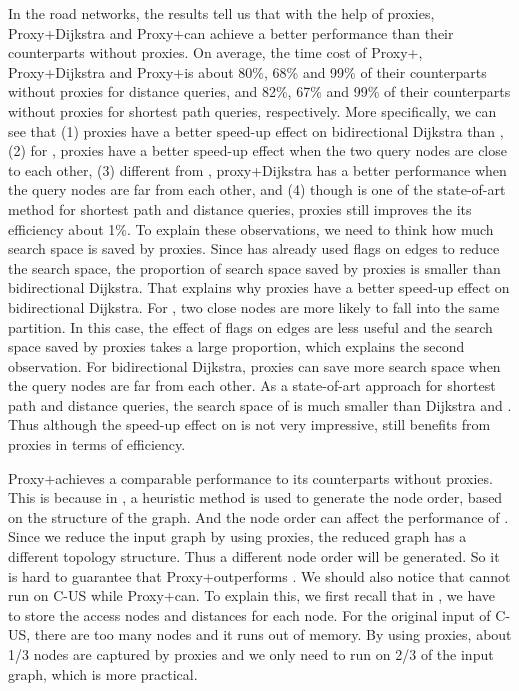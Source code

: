 In the road networks, the results tell us that with the help of proxies, Proxy+Dijkstra and Proxy+\arcflag can achieve a better performance than their counterparts without proxies. On average, the time cost of Proxy+\arcflag, Proxy+Dijkstra and Proxy+\ah is about 80\%, 68\% and 99\% of their counterparts without proxies for distance queries, and 82\%, 67\% and 99\% of their counterparts without proxies for shortest path queries, respectively. More specifically, we can see that (1) proxies have a better speed-up effect on bidirectional Dijkstra than \arcflag, (2) for \arcflag, proxies have a better speed-up effect when the two query nodes are close to each other, (3) different from \arcflag, proxy+Dijkstra has a better performance when the query nodes are far from each other, and (4) though \ah is one of the state-of-art method for shortest path and distance queries, proxies still improves the its efficiency about 1\%. To explain these observations, we need to think how much search space is saved by proxies. Since \arcflag has already used flags on edges to reduce the search space, the proportion of search space saved by proxies is smaller than bidirectional Dijkstra. That explains why proxies have a better speed-up effect on bidirectional Dijkstra. For \arcflag, two close nodes are more likely to fall into the same partition. In this case, the effect of flags on edges are less useful and the search space saved by proxies takes a large proportion, which explains the second observation. For bidirectional Dijkstra, proxies can save more search space when the query nodes are far from each other. As a state-of-art approach for shortest path and distance queries, the search space of \ah is much smaller than Dijkstra and \arcflag. Thus although the speed-up effect on \ah is not very impressive, \ah still benefits from proxies in terms of efficiency.

Proxy+\tnr achieves a comparable performance to its counterparts without proxies. This is because in \tnr, a heuristic method is used to generate the node order, based on the structure of the graph. And the node order can affect the performance of \tnr. Since we reduce the input graph by using proxies, the reduced graph has a different topology structure. Thus a different node order will be generated. So it is hard to guarantee that Proxy+\tnr outperforms \tnr. We should also notice that \tnr cannot run on C-US while Proxy+\tnr can. To explain this, we first recall that in \tnr, we have to store the access nodes and distances for each node. For the original input of C-US, there are too many nodes and it runs out of memory. By using proxies, about 1/3 nodes are captured by proxies and we only need to run \tnr on 2/3 of the input graph, which is more practical.


